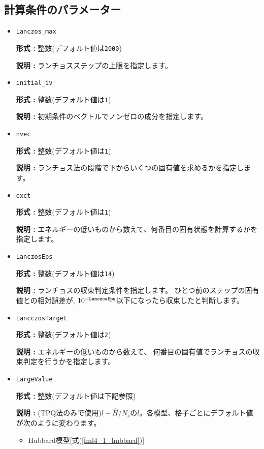 \subsection{計算条件のパラメーター}
\begin{itemize}
\item \verb|Lanczos_max|

{\bf 形式 :} 整数(デフォルト値は\verb|2000|)

{\bf 説明 :} ランチョスステップの上限を指定します。

\item \verb|initial_iv|

{\bf 形式 :} 整数(デフォルト値は\verb|1|)

{\bf 説明 :} 初期条件のベクトルでノンゼロの成分を指定します。

\item \verb|nvec|

{\bf 形式 :} 整数(デフォルト値は\verb|1|)

{\bf 説明 :} ランチョス法の段階で下からいくつの固有値を求めるかを指定します。

\item \verb|exct|

{\bf 形式 :} 整数(デフォルト値は\verb|1|)

{\bf 説明 :} エネルギーの低いものから数えて、何番目の固有状態を計算するかを指定します。

\item \verb|LanczosEps|

{\bf 形式 :} 整数(デフォルト値は\verb|14|)

{\bf 説明 :} ランチョスの収束判定条件を指定します。
ひとつ前のステップの固有値との相対誤差が, $10^{-{\tt LanczosEps}}$以下になったら収束したと判断します。

\item \verb|LancczosTarget|

{\bf 形式 :} 整数(デフォルト値は\verb|2|)

{\bf 説明 :} エネルギーの低いものから数えて、
何番目の固有値でランチョスの収束判定を行うかを指定します。

\item \verb|LargeValue|

{\bf 形式 :} 整数(デフォルト値は下記参照)

{\bf 説明 :} (TPQ法のみで使用)$l-\hat{H}/N_{s}$の$l$。各模型、格子ごとにデフォルト値が次のように変わります。

\begin{itemize}

\item Hubbard模型[式(\ref{fml4_1_hubbard})]


\end{itemize}
\end{itemize}
